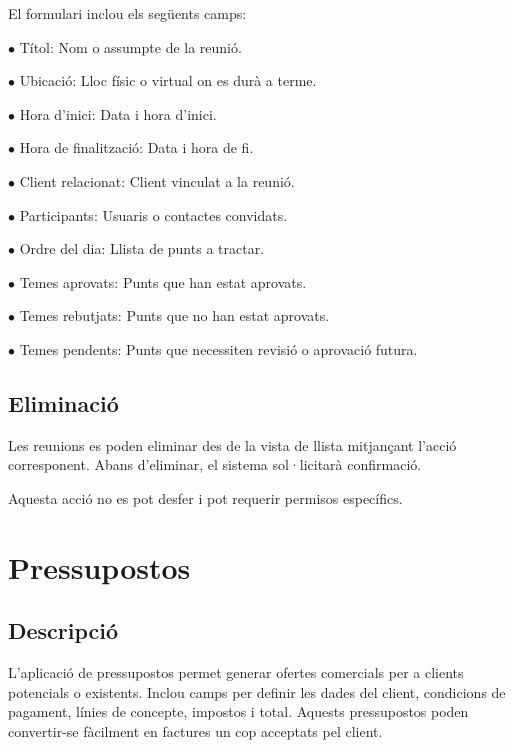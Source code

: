 \documentclass[a4paper]{article}
\begin{document}
El formulari inclou els següents camps:

\begin{compactitem}
\item[\color{myblue}$\bullet$] Títol: Nom o assumpte de la reunió.
\item[\color{myblue}$\bullet$] Ubicació: Lloc físic o virtual on es durà a terme.
\item[\color{myblue}$\bullet$] Hora d'inici: Data i hora d'inici.
\item[\color{myblue}$\bullet$] Hora de finalització: Data i hora de fi.
\item[\color{myblue}$\bullet$] Client relacionat: Client vinculat a la reunió.
\item[\color{myblue}$\bullet$] Participants: Usuaris o contactes convidats.
\item[\color{myblue}$\bullet$] Ordre del dia: Llista de punts a tractar.
\item[\color{myblue}$\bullet$] Temes aprovats: Punts que han estat aprovats.
\item[\color{myblue}$\bullet$] Temes rebutjats: Punts que no han estat aprovats.
\item[\color{myblue}$\bullet$] Temes pendents: Punts que necessiten revisió o aprovació futura.
\end{compactitem}

\hypertarget{toc70}{}
\subsection{Eliminació}

Les reunions es poden eliminar des de la vista de llista mitjançant l'acció corresponent.
Abans d'eliminar, el sistema sol·licitarà confirmació.

Aquesta acció no es pot desfer i pot requerir permisos específics.


\hypertarget{toc71}{}
\section{Pressupostos}

\hypertarget{toc72}{}
\subsection{Descripció}

L'aplicació de pressupostos permet generar ofertes comercials per a clients potencials o existents.
Inclou camps per definir les dades del client, condicions de pagament, línies de concepte, impostos i total.
Aquests pressupostos poden convertir-se fàcilment en factures un cop acceptats pel client.
\end{document}
